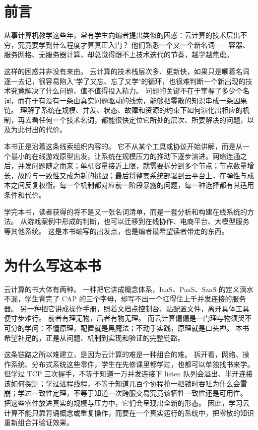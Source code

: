 
\section*{前言}

从事计算机教学这些年，常有学生向编者提出类似的困惑：云计算的技术层出不穷，究竟要学到什么程度才算真正入门？
他们熟悉一个又一个新名词——容器、服务网格、无服务器计算，却总觉得跟不上技术迭代的节奏，越学越焦虑。

这样的困惑并非没有来由。
云计算的技术栈层次多、更新快，如果只是顺着名词逐一去记，很容易陷入"学了又忘、忘了又学"的循环，也很难判断一个新出现的技术究竟解决了什么问题、值不值得投入精力。
问题的关键不在于掌握了多少个名词，而在于有没有一条由真实问题驱动的线索，能够把零散的知识串成一条因果链。
理解了系统在规模、并发、状态、故障和资源的约束下如何演化出相应的机制，再去看任何一个技术名词，都能很快定位它所处的层次、所要解决的问题，以及为此付出的代价。

本书正是沿着这条线索组织内容的。
它不从某个工具或协议开始讲解，而是从一个最小的在线游戏原型出发，让系统在规模压力的推动下逐步演进。网络连通之后，并发问题随之而来；单机容量接近上限，就需要拆分到多个节点；节点数量增长，故障与一致性又成为新的挑战；最后将整套系统部署到云平台上，在弹性与成本之间反复权衡。每一个机制都对应前一阶段暴露的问题，每一种选择都有其适用条件和代价。

学完本书，读者获得的将不是又一张名词清单，而是一套分析和构建在线系统的方法。
从游戏案例中形成的判断，也可以迁移到在线协作、电商平台、大模型服务等其他系统。
这是本书编写的出发点，也是编者最希望读者带走的东西。

\section*{为什么写这本书}

云计算的书大体有两种。
一种把它讲成概念体系，IaaS、PaaS、SaaS 的定义滴水不漏，学生背完了 CAP 的三个字母，却写不出一个扛得住上千并发连接的服务器。
另一种把它讲成操作手册，照着文档点控制台、贴配置文件，离开具体工具便寸步难行。
前者有理无物，后者有物无理。
而云计算偏偏是一门理与物须臾不可分的学问：不懂原理，配置就是黑魔法；不动手实践，原理就是口头禅。
本书希望补足的，正是从问题、机制到实现和验证的完整链路。

这条链路之所以难建立，是因为云计算的难是一种组合的难。
拆开看，网络、操作系统、分布式系统这些零件，学生在先修课里都学过，也都可以单独找书来学。
但学过 TCP 三次握手，不等于知道一万并发连接下 listen 队列会溢出、半开连接该如何探测；学过进程线程，不等于知道几百个协程抢一把锁时吞吐为什么会雪崩；学过一致性定理，不等于知道一次跨服交易究竟该牺牲一致性还是可用性。
把这些零件放进真实的规模与压力中，它们会呈现出全新的形态。
因此，学习云计算不能只靠背诵概念或重复操作，而要在一个真实运行的系统中，把零散的知识重新组合并验证效果。

